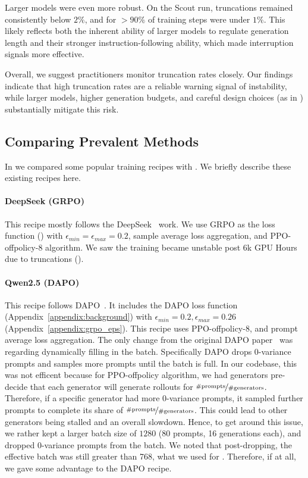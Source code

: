 Larger models were even more robust. 
On the Scout run, truncations remained consistently below $2\%$, and for $>90\%$ of training steps were under $1\%$. 
This likely reflects both the inherent ability of larger models to regulate generation length and their stronger instruction-following ability, which made interruption signals more effective. 

Overall, we suggest practitioners monitor truncation rates closely. 
Our findings indicate that high truncation rates are a reliable warning signal of instability, while larger models, higher generation budgets, and careful design choices (as in \scalerl) substantially mitigate this risk.






\subsection{Comparing Prevalent Methods}\label{appendix:prevelant_methods}
In  we compared some popular training recipes with \scalerl. We briefly describe these existing recipes here.

\paragraph{DeepSeek (GRPO)}
This recipe mostly follows the DeepSeek~\cite{guo2025deepseek} work. We use GRPO as the loss function () with $\epsilon_{min}=\epsilon_{max}=0.2$, sample average loss aggregation, and PPO-offpolicy-8 algorithm. We saw the training became unstable post 6k GPU Hours due to truncations ().

\paragraph{Qwen2.5 (DAPO)}
This recipe follows DAPO~\cite{yu2025dapo}. It includes the DAPO loss function (Appendix~\ref{appendix:background}) with $\epsilon_{min} = 0.2, \epsilon_{max}=0.26$ (Appendix~\ref{appendix:grpo_eps}). This recipe uses PPO-offpolicy-8, and prompt average loss aggregation. The only change from the original DAPO paper~\citep{yu2025dapo} was regarding dynamically filling in the batch. Specifically DAPO drops 0-variance prompts and samples more prompts until the batch is full. In our codebase, this was not efficent because for PPO-offpolicy algorithm, we had generators pre-decide that each generator will generate rollouts for $\nicefrac{\#\text{prompts}}{\#\text{generators}}$. Therefore, if a specific generator had more 0-variance prompts, it sampled further prompts to complete its share of $\nicefrac{\#\text{prompts}}{\#\text{generators}}$. This could lead to other generators being stalled and an overall slowdown. Hence, to get around this issue, we rather kept a larger batch size of $1280$ (80 prompts, 16 generations each), and dropped 0-variance prompts from the batch. We noted that post-dropping, the effective batch was still greater than 768, what we used for \scalerl. Therefore, if at all, we gave some advantage to the DAPO recipe.

